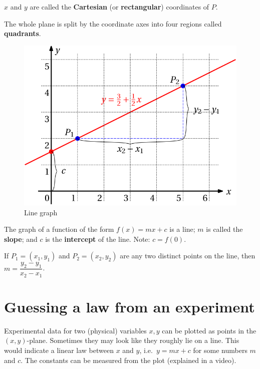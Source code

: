 \documentclass[
  12pt,
  oneside]{book}
\theoremstyle{definition}
\theoremstyle{definition}
\theoremstyle{definition}
\theoremstyle{definition}
\theoremstyle{remark}
\begin{document}
\(x\) and \(y\) are called the \textbf{Cartesian} (or \textbf{rectangular}) coordinates of \(P\).

The whole plane is split by the coordinate axes into four regions called \textbf{quadrants}.

\begin{figure}

{\centering \includegraphics{t16-line} 

}

\caption{Line graph}\label{fig:unnamed-chunk-67}
\end{figure}

The graph of a function of the form \(f(x)=mx+c\) is a line; \(m\) is called the \textbf{slope}; and \(c\) is the \textbf{intercept} of the line. Note: \(c=f(0)\).

If \(P_1=(x_1,y_1)\) and \(P_2=(x_2,y_2)\) are any two distinct points on the line, then \(m=\dfrac{y_2-y_1}{x_2-x_1}\).

\hypertarget{guessing-a-law-from-an-experiment}{%
\section{Guessing a law from an experiment}\label{guessing-a-law-from-an-experiment}}

Experimental data for two (physical) variables \(x,y\) can be plotted as points
in the \((x,y)\)-plane. Sometimes they may look like they roughly lie on a line.
This would indicate a linear law between \(x\) and \(y\), i.e.~\(y=mx+c\) for some numbers \(m\) and \(c\). The constants can be measured from the plot (explained in a video).
\end{document}
